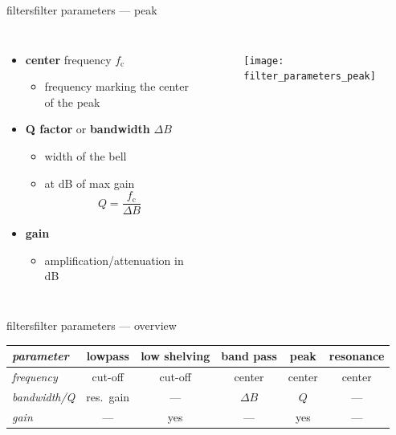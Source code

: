         \begin{frame}{filters}{filter parameters --- peak}
            \begin{columns}
                \begin{itemize}
                    \item   \textbf{center} frequency $f_\mathrm{c}$
                        \begin{itemize}
                            \item   frequency marking the center of the peak
                        \end{itemize}
                    \smallskip
                    \item   \textbf{Q factor} or \textbf{bandwidth} $\Delta B$
                        \begin{itemize}
                            \item   width of the bell
                            \item   at \unit[-3]{dB} of max gain
                            \[Q = \frac{f_\mathrm{c}}{\Delta B}\]
                        \end{itemize}
                    \smallskip
                    \item   \textbf{gain}    
                        \begin{itemize}
                            \item   amplification/attenuation in dB
                        \end{itemize}
                \end{itemize}
                \begin{figure}%
                    \texttt{[image: filter\_parameters\_peak]}%
                \end{figure}
            \end{columns}
        \end{frame}
        \begin{frame}{filters}{filter parameters --- overview}
            \begin{footnotesize}
            \begin{table}%
            \begin{tabular}{l|ccccc}
                \textit{parameter} & \textbf{lowpass} & \textbf{low shelving} & \textbf{band pass} & \textbf{peak} & \textbf{resonance}\\ \hline
                \textit{frequency} &cut-off&cut-off&center&center&center\\
                \textit{bandwidth/Q} &res.\ gain&---&$\Delta B$& $Q$ &---\\
                \textit{gain} &---&yes&---&yes&---
            \end{tabular}
            \end{table}
            \end{footnotesize}
        \end{frame}
        

